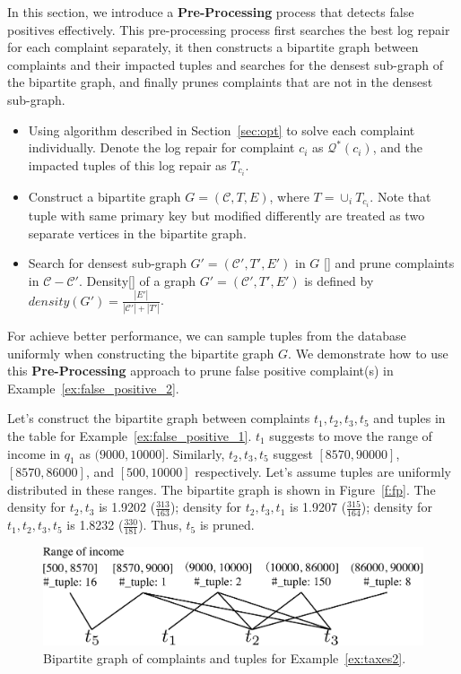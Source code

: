 In this section, we introduce a \textbf{Pre-Processing} process that detects 
false positives effectively. This pre-processing process first searches the 
best log repair for each complaint separately, it then constructs 
a bipartite graph between complaints and their impacted tuples and
searches for the densest sub-graph of the bipartite graph, and finally 
prunes complaints that are not in the densest sub-graph.
\begin{itemize}
\item Using algorithm described in Section~\ref{sec:opt} to solve each 
complaint individually. Denote the log repair for complaint $c_i$ 
as $\mathcal{Q}^*(c_i)$, and the impacted tuples of this log repair as
$T_{c_i}$.
\item Construct a bipartite graph $G = (\mathcal{C}, T, E)$, where 
$T = \cup_{i} T_{c_i}$. Note that tuple with same primary key but modified 
differently are treated as two separate vertices in the bipartite graph. 
\item Search for densest sub-graph $G' = (\mathcal{C}', T', E')$ in $G$ 
[]  and prune complaints in $\mathcal{C} - \mathcal{C}'$. 
Density[] of a graph $G' = (\mathcal{C}', T', E')$
 is defined by $density(G') = \frac{|E'|}{|\mathcal{C}'|+|T'|}$. 
\end{itemize}
For achieve better performance, we can sample tuples
from the database uniformly when constructing the bipartite graph $G$. 
We demonstrate how to use this \textbf{Pre-Processing} 
approach to prune false positive complaint(s) in Example~\ref{ex:false_positive_2}. 
\begin{example}
\label{ex:false_positive_2}
Let's construct the bipartite graph between complaints $t_1, t_2, t_3, t_5$ 
and tuples in the table for Example~\ref{ex:false_positive_1}. 
$t_1$ suggests to move the range of income in $q_1$ 
as $(9000, 10000]$. Similarly, $t_2, t_3, t_5$ suggest $[8570, 90000]$, 
$[8570, 86000]$, and $[500, 10000]$ respectively. Let's assume tuples are
uniformly distributed in these ranges. The bipartite graph is shown in 
Figure~\ref{f:fp}. The density for $t_2, t_3$ is 1.9202 ($\frac{313}{163}$);
density for $t_2, t_3, t_1$ is 1.9207 ($\frac{315}{164}$); density for 
$t_1, t_2, t_3, t_5$ is 1.8232 ($\frac{330}{181}$). Thus, $t_5$ is pruned. 
\begin{figure}[ht]
\centering
\includegraphics[width = 0.85\columnwidth]{figures/falsepositive_example}
\caption{Bipartite graph of complaints and tuples for Example~\ref{ex:taxes2}. }
\label{f:pf} 
\end{figure}
\end{example}
